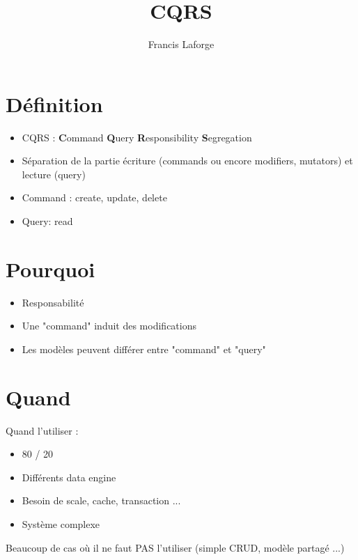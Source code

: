 \documentclass{beamer}
\title{CQRS}
\author{Francis Laforge}
\institute{Introduction au pattern CQRS}
\begin{document}
  \begin{frame}
  \titlepage
  \end{frame}


	\section{Définition}
	\begin{frame}
		\begin{itemize}
	    \item \textsc{CQRS} : \textbf{C}ommand \textbf{Q}uery \textbf{R}esponsibility \textbf{S}egregation
	    \item Séparation de la partie écriture (commands ou encore modifiers, mutators) et lecture (query)
	    \item Command : create, update, delete
	    \item Query: read
		\end{itemize}
	\end{frame}

  \section{Pourquoi}
  \begin{frame}
  		\begin{itemize}
	  		\item Responsabilité
	  		\item Une "command" induit des modifications
	  		\item Les modèles peuvent différer entre "command" et "query"
  		\end{itemize}
	\end{frame}

  \section{Quand}
  \begin{frame}
  	Quand l'utiliser :
	\begin{itemize}
	  	\item 80 / 20
	  	\item Différents data engine
	  	\item Besoin de scale, cache, transaction ...
		\item Système complexe
    \end{itemize}
	Beaucoup de cas où il ne faut PAS l'utiliser (simple CRUD, modèle partagé ...)
  \end{frame}
\end{document}
